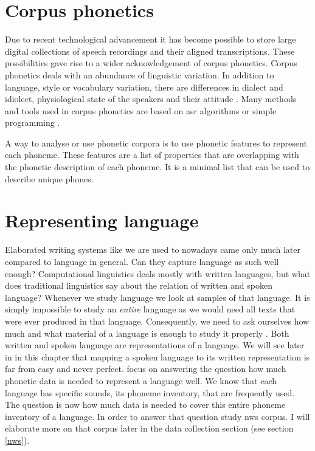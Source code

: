 
\section{Corpus phonetics}
Due to recent technological advancement it has become possible to store large digital collections of speech recordings and their aligned transcriptions. These possibilities gave rise to a wider acknowledgement of corpus phonetics. Corpus phonetics deals with an abundance of linguistic variation. In addition to language, style or vocabulary variation, there are differences in dialect and idiolect, physiological state of the speakers and their attitude \citep{Liberman.2019, Chodroff.19.07.2019}. Many methods and tools used in corpus phonetics are based on \ac{asr} algorithms or simple programming \citep{Chodroff.19.07.2019}.

A way to analyse or use phonetic corpora is to use phonetic features to represent each phoneme. These features are a list of properties that are overlapping with the phonetic description of each phoneme. It is a minimal list that can be used to describe unique phones. 

\section{Representing language}

Elaborated writing systems like we are used to nowadays came only much later compared to language in general. Can they capture language as such well enough? Computational linguistics deals mostly with written languages, but what does traditional linguistics say about the relation of written and spoken language? Whenever we study language we look at samples of that language. It is simply impossible to study an \textit{entire} language as we would need all texts that were ever produced in that language. Consequently, we need to ask ourselves how much and what material of a language is enough to study it properly \citep{baird_evans_greenhill_2021}. Both written and spoken language are representations of a language. We will see later in in this chapter that mapping a spoken language to its written representation is far from easy and never perfect. \citet{baird_evans_greenhill_2021} focus on answering the question how much phonetic data is needed to represent a language well. We know that each language has specific sounds, its phoneme inventory, that are frequently used. The question is now how much data is needed to cover this entire phoneme inventory of a language. In order to answer that question \citet{baird_evans_greenhill_2021} study \ac{nws} corpus. I will elaborate more on that corpus later in the data collection section (see section \ref{nws}).


